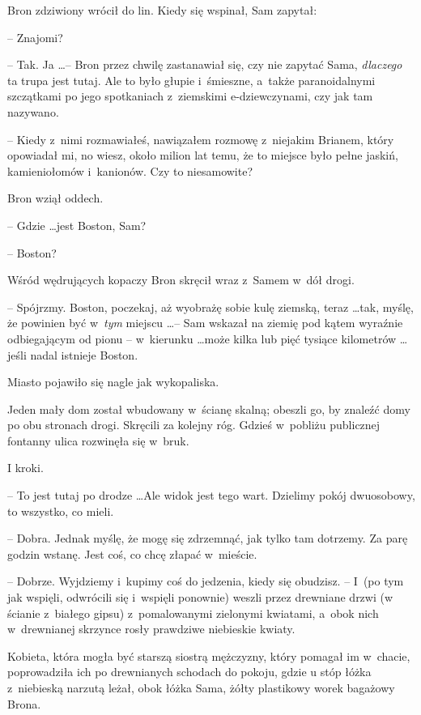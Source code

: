 \documentclass[oneside,polish,11pt,rmheadings]{mwbk}
\begin{document}
Bron zdziwiony wrócił do lin. Kiedy się wspinał, Sam zapytał: 

-- Znajomi? 

-- Tak. Ja \ldots  -- Bron przez chwilę zastanawiał się, czy nie zapytać Sama, \textit{dlaczego }ta trupa jest tutaj. Ale to było głupie i~śmieszne, a~także paranoidalnymi szczątkami po jego spotkaniach z~ziemskimi e-dziewczynami, czy jak tam nazywano. 

-- Kiedy z~nimi rozmawiałeś, nawiązałem rozmowę z~niejakim Brianem, który opowiadał mi, no wiesz, około milion lat temu, że to miejsce było pełne jaskiń, kamieniołomów i~kanionów. Czy to niesamowite? 

Bron wziął oddech. 

-- Gdzie \ldots  jest Boston, Sam? 

-- Boston? 

Wśród wędrujących kopaczy Bron skręcił wraz z~Samem w~dół drogi. 

-- Spójrzmy. Boston, poczekaj, aż wyobrażę sobie kulę ziemską, teraz \ldots  tak, myślę, że powinien być w~\textit{tym }miejscu  \ldots  -- Sam wskazał na ziemię pod kątem wyraźnie odbiegającym od pionu -- w~kierunku \ldots  może kilka lub pięć tysiące kilometrów  \ldots  jeśli nadal istnieje Boston. 

Miasto pojawiło się nagle jak wykopaliska. 

Jeden mały dom został wbudowany w~ścianę skalną; obeszli go, by znaleźć domy po obu stronach drogi. Skręcili za kolejny róg. Gdzieś w~pobliżu publicznej fontanny ulica rozwinęła się w~bruk. 

I kroki. 

-- To jest tutaj po drodze \ldots  Ale widok jest tego wart. Dzielimy pokój dwuosobowy, to wszystko, co mieli. 

-- Dobra. Jednak myślę, że mogę się zdrzemnąć, jak tylko tam dotrzemy. Za parę godzin wstanę. Jest coś, co chcę złapać w~mieście. 

-- Dobrze. Wyjdziemy i~kupimy coś do jedzenia, kiedy się obudzisz. -- I~(po tym jak wspięli, odwrócili się i~wspięli ponownie) weszli przez drewniane drzwi (w ścianie z~białego  gipsu) z~pomalowanymi zielonymi kwiatami, a~obok nich w~drewnianej skrzynce rosły prawdziwe niebieskie kwiaty. 

Kobieta, która mogła być starszą siostrą mężczyzny, który pomagał im w~chacie, poprowadziła ich po drewnianych schodach do pokoju, gdzie u stóp łóżka z~niebieską narzutą leżał, obok łóżka Sama, żółty plastikowy worek bagażowy Brona. 
\end{document}
